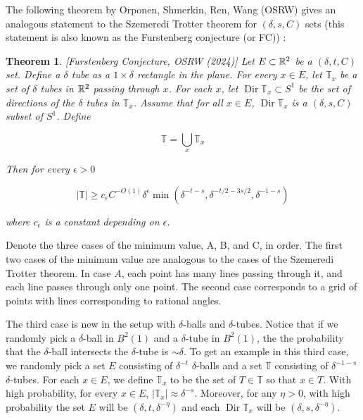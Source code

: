 \documentclass[12pt]{amsart}
\newtheorem{theorem}{Theorem}[section]
\DeclareMathOperator{\Dir}{Dir}
\newcommand{\TT}{\mathbb{T}}
\begin{document}
The following theorem by Orponen, Shmerkin, Ren, Wang (OSRW) gives an analogous statement to the Szemeredi Trotter theorem for $(\delta, s, C)$ sets (this statement is also known as the Furstenberg conjecture (or FC)) :

\begin{theorem} \label{thmFur} [Furstenberg Conjecture, OSRW (2024)]
    Let $E \subset \mathbb{R}^2$ be a $(\delta, t, C)$ set. Define a $\delta$ tube as a $1\times \delta$ rectangle in the plane. For every $x \in E$, let $\mathbb{T}_x$ be a set of $\delta$ tubes in $\mathbb{R}^2$ passing through $x$. For each $x$, let $\Dir \mathbb{T}_x \subset S^1$ be the set of directions of the $\delta$ tubes in $\mathbb{T}_x$. Assume that for all $x\in E$, $\Dir \mathbb{T}_x $ is a $(\delta, s, C)$ subset of $S^1$. Define 

    \[ \mathbb{T}  = \bigcup_x \mathbb{T}_x\] 

    Then for every $\epsilon > 0$

    \begin{equation}
        |\mathbb{T}| \geq c_\epsilon C^{-O(1)}\delta^\epsilon \min (\delta^{-t-s}, \delta^{-t/2 - 3s/2}, \delta^{-1-s})
    \end{equation} 

    where $c_\epsilon$ is a constant depending on $\epsilon$. 

\end{theorem}

Denote the three cases of the minimum value, A, B, and C, in order. The first two cases of the minimum value are analogous to the cases of the Szemeredi Trotter theorem. In case $A$, each point has many lines passing through it, and each line passes through only one point. The second case corresponds to a grid of points with lines corresponding to rational angles. 

The third case is new in the setup with $\delta$-balls and $\delta$-tubes.   Notice that if we randomly pick a $\delta$-ball in $B^2(1)$ and a  $\delta$-tube in $B^2(1)$,  the the probability that the $\delta$-ball intersects the $\delta$-tube is $\sim \delta$.   To get an example in this third case, we randomly pick a set $E$ consisting of $\delta^{-t}$ $\delta$-balls and a set $\TT$ consisting of $\delta^{-1-s}$ $\delta$-tubes.   For each $x \in E$,  we define $\TT_x$ to be the set of $T \in \TT$ so that $x \in T$.    With high probability,  for every $x \in E$,  $|\TT_x| \approx \delta^{- s}$.   Moreover,  for any $\eta > 0$, with high probability the set $E$ will be $(\delta,  t,  \delta^{-\eta})$ and each $\Dir \TT_x$ will be $(\delta,  s, \delta^{- \eta})$.  
\end{document}
